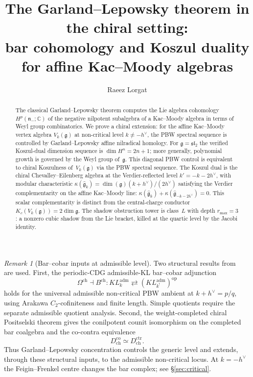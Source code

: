 \documentclass[11pt]{article}
\title{The Garland--Lepowsky theorem in the chiral setting:\\
bar cohomology and Koszul duality for affine Kac--Moody algebras}
\author{Raeez Lorgat}
\date{}
\theoremstyle{plain}
\theoremstyle{definition}
\theoremstyle{remark}
\newtheorem{remark}[theorem]{Remark}
\newcommand{\fg}{\mathfrak{g}}
\newcommand{\fn}{\mathfrak{n}}
\newcommand{\fsl}{\mathfrak{sl}}
\newcommand{\ghat}{\widehat{\fg}}
\numberwithin{equation}{section}
\begin{document}
\maketitle


\begin{abstract}
The classical Garland--Lepowsky theorem computes the Lie algebra
cohomology $H^p(\fn_-; \mathbb{C})$ of the negative nilpotent
subalgebra of a Kac--Moody algebra in terms of Weyl group
combinatorics. We prove a chiral extension: for the affine
Kac--Moody vertex algebra $V_k(\fg)$ at non-critical level
$k \neq -h^\vee$, the PBW spectral sequence is controlled by
Garland--Lepowsky affine nilradical homology. For $\fg=\fsl_2$ the
verified Koszul-dual dimension sequence is $\dim H^n=2n+1$; more
generally, polynomial growth is governed by the Weyl group of~$\fg$.
This diagonal PBW control is equivalent to chiral Koszulness of~$V_k(\fg)$
via the PBW spectral sequence. The Koszul dual is the chiral
Chevalley--Eilenberg algebra at the Verdier-reflected level
$k' = -k - 2h^\vee$, with modular characteristic
$\kappa(\ghat_k) = \dim(\fg)(k{+}h^\vee)/(2h^\vee)$ satisfying the
Verdier complementarity on the affine Kac--Moody line:
$\kappa(\ghat_k)+\kappa(\ghat_{-k-2h^\vee})=0$. This scalar
complementarity is distinct from the central-charge conductor
$K_c(V_k(\fg))=2\dim\fg$. The shadow obstruction tower is class~$L$
with depth $r_{\max} = 3$: a nonzero cubic shadow from the Lie
bracket, killed at the quartic level by the Jacobi identity.
\end{abstract}

\begin{remark}[Bar--cobar inputs at admissible level]\label{rem:gl-inputs}
Two structural results from~\cite{Lor-MKD} are used. First, the
periodic-CDG admissible-KL bar--cobar adjunction
\[
\Omega^{\mathrm{ch}} \dashv B^{\mathrm{ch}}\colon
KL_k^{\mathrm{adm}} \rightleftarrows
(KL_{k^!}^{\mathrm{adm}})^{\mathrm{op}}
\]
holds for the universal admissible non-critical PBW ambient at
\(k+h^\vee=p/q\), using Arakawa \(C_2\)-cofiniteness and finite
length. Simple quotients require the separate admissible quotient
analysis. Second, the
weight-completed chiral Positselski theorem gives the conilpotent
counit isomorphism on the completed bar coalgebra and the co-contra
equivalence
\[
D^{\mathrm{co}}_{\mathrm{ch}}\simeq D^{\mathrm{ctr}}_{\mathrm{ch}}.
\]
Thus Garland--Lepowsky concentration controls the generic level and
extends, through these structural inputs, to the admissible
non-critical locus. At \(k=-h^\vee\) the Feigin--Frenkel centre
changes the bar complex; see \S\ref{sec:critical}.
\end{remark}
\end{document}

